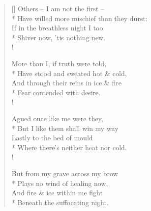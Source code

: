 \documentclass[MAIN]{subfiles}
\begin{document}
\settowidth{\versewidth}{Have willed more mischief than they durst:}
\begin{verse}[\versewidth]
Others -- I am not the first --\\*
Have willed more mischief than they durst:\\
If in the breathless night I too\\*
Shiver now, 'tis nothing new.\\!

More than I, if truth were told,\\*
Have stood and sweated hot \& cold,\\
And through their reins in ice \& fire\\*
Fear contended with desire.\\!

Agued once like me were they,\\*
But I like them shall win my way\\
Lastly to the bed of mould\\*
Where there's neither heat nor cold.\\!

But from my grave across my brow\\*
Plays no wind of healing now,\\
And fire \& ice within me fight\\*
Beneath the suffocating night.
\end{verse}
\end{document}
